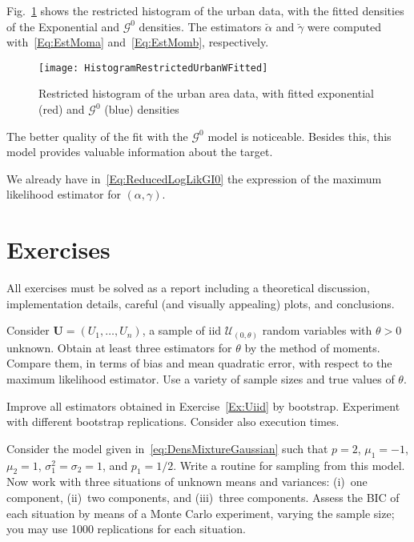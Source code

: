 Fig.~\ref{Fig:UrbanFitted} shows the restricted histogram of the urban data, with the fitted densities of the Exponential and $\mathcal G^0$ densities.
The estimators $\breve{\alpha}$ and $\breve{\gamma}$ were computed with~\eqref{Eq:EstMoma} and~\eqref{Eq:EstMomb}, respectively.

\begin{figure}[hbt]
\centering
\texttt{[image: HistogramRestrictedUrbanWFitted]}
\caption{Restricted histogram of the urban area data, with fitted exponential (red) and $\mathcal G^0$ (blue) densities}\label{Fig:UrbanFitted}
\end{figure}

The better quality of the fit with the $\mathcal G^0$ model is noticeable.
Besides this, this model provides valuable information about the target.

We already have in~\eqref{Eq:ReducedLogLikGI0} the expression of the maximum likelihood estimator for $(\alpha,\gamma)$.

\section*{Exercises}

All exercises must be solved as a report including a theoretical discussion, implementation details, careful (and visually appealing) plots, and conclusions.

\begin{exer}\label{Ex:Uiid}
Consider $\bm U=(U_1,\dots,U_n)$, a sample of iid $\mathcal U_{(0,\theta)}$ random variables with $\theta>0$ unknown.
Obtain at least three estimators for $\theta$ by the method of moments.
Compare them, in terms of bias and mean quadratic error, with respect to the maximum likelihood estimator.
Use a variety of sample sizes and true values of $\theta$.
\end{exer}

\begin{exer}
Improve all estimators obtained in Exercise~\ref{Ex:Uiid} by bootstrap.
Experiment with different bootstrap replications.
Consider also execution times.
\end{exer}

\begin{exer}
Consider the model given in~\eqref{eq:DensMixtureGaussian} such that $p=2$, $\mu_1=-1$, $\mu_2=1$, $\sigma_1^2=\sigma_2=1$, and $p_1=1/2$.
Write a routine for sampling from this model.
Now work with three situations of unknown means and variances:
(i)~one component, (ii)~two components, and (iii)~three components.
Assess the BIC of each situation by means of a Monte Carlo experiment, varying the sample size; you may use \num{1000} replications for each situation.
\end{exer}

